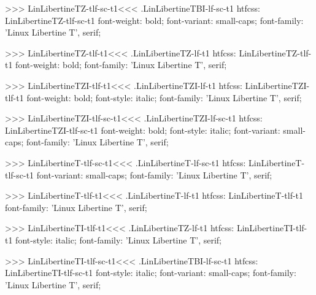{{{{{{{>>>
\<LinLibertineTZ-tlf-sc-t1\><<<
.LinLibertineTBI-lf-sc-t1
htfcss:  LinLibertineTZ-tlf-sc-t1  font-weight: bold; font-variant: small-caps; font-family: 'Linux Libertine T', serif;

>>>
\<LinLibertineTZ-tlf-t1\><<<
.LinLibertineTZ-lf-t1
htfcss:  LinLibertineTZ-tlf-t1  font-weight: bold; font-family: 'Linux Libertine T', serif;

>>>
\<LinLibertineTZI-tlf-t1\><<<
.LinLibertineTZI-lf-t1
htfcss:  LinLibertineTZI-tlf-t1  font-weight: bold; font-style: italic; font-family: 'Linux Libertine T', serif;

>>>
\<LinLibertineTZI-tlf-sc-t1\><<<
.LinLibertineTZI-lf-sc-t1
htfcss:  LinLibertineTZI-tlf-sc-t1  font-weight: bold; font-style: italic; font-variant: small-caps; font-family: 'Linux Libertine T', serif;

>>>
\<LinLibertineT-tlf-sc-t1\><<<
.LinLibertineT-lf-sc-t1
htfcss:  LinLibertineT-tlf-sc-t1  font-variant: small-caps; font-family: 'Linux Libertine T', serif;

>>>
\<LinLibertineT-tlf-t1\><<<
.LinLibertineT-lf-t1
htfcss:  LinLibertineT-tlf-t1  font-family: 'Linux Libertine T', serif;

>>>
\<LinLibertineTI-tlf-t1\><<<
.LinLibertineTZ-lf-t1
htfcss:  LinLibertineTI-tlf-t1  font-style: italic; font-family: 'Linux Libertine T', serif;

>>>
\<LinLibertineTI-tlf-sc-t1\><<<
.LinLibertineTBI-lf-sc-t1
htfcss:  LinLibertineTI-tlf-sc-t1  font-style: italic; font-variant: small-caps; font-family: 'Linux Libertine T', serif;

}}}}}}}
